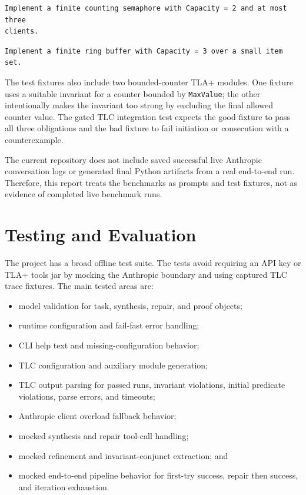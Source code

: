 \documentclass[11pt]{article}
\begin{document}
\begin{lstlisting}
Implement a finite counting semaphore with Capacity = 2 and at most three
clients.
\end{lstlisting}

\begin{lstlisting}
Implement a finite ring buffer with Capacity = 3 over a small item set.
\end{lstlisting}

The test fixtures also include two bounded-counter TLA+ modules. One fixture
uses a suitable invariant for a counter bounded by \texttt{MaxValue}; the other
intentionally makes the invariant too strong by excluding the final allowed
counter value. The gated TLC integration test expects the good fixture to pass
all three obligations and the bad fixture to fail initiation or consecution
with a counterexample.

The current repository does not include saved successful live Anthropic
conversation logs or generated final Python artifacts from a real end-to-end
run. Therefore, this report treats the benchmarks as prompts and test fixtures,
not as evidence of completed live benchmark runs.

\section{Testing and Evaluation}

The project has a broad offline test suite. The tests avoid requiring an API
key or TLA+ tools jar by mocking the Anthropic boundary and using captured TLC
trace fixtures. The main tested areas are:

\begin{itemize}[leftmargin=*]
  \item model validation for task, synthesis, repair, and proof objects;
  \item runtime configuration and fail-fast error handling;
  \item CLI help text and missing-configuration behavior;
  \item TLC configuration and auxiliary module generation;
  \item TLC output parsing for passed runs, invariant violations, initial
  predicate violations, parse errors, and timeouts;
  \item Anthropic client overload fallback behavior;
  \item mocked synthesis and repair tool-call handling;
  \item mocked refinement and invariant-conjunct extraction; and
  \item mocked end-to-end pipeline behavior for first-try success, repair then
  success, and iteration exhaustion.
\end{itemize}
\end{document}
